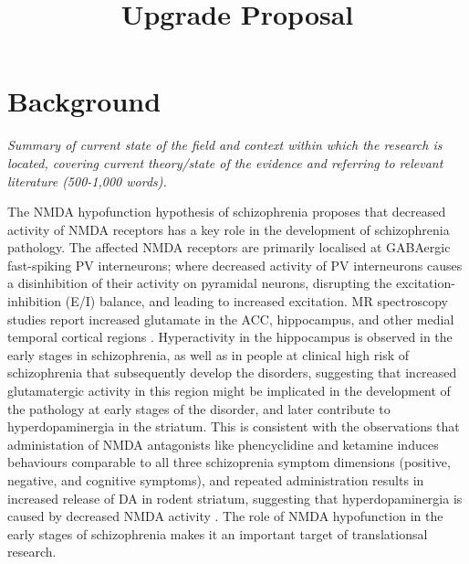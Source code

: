\documentclass[
  letterpaper,
  DIV=11,
  numbers=noendperiod]{scrartcl}
\title{Upgrade Proposal}
\author{Julia Marcinkowska \and  \and }
\date{}
\begin{document}
\maketitle

\section{Background}\label{background}

\emph{Summary of current state of the field and context within which the
research is located, covering current theory/state of the evidence and
referring to relevant literature (500-1,000 words).}

The NMDA hypofunction hypothesis of schizophrenia proposes that
decreased activity of NMDA receptors has a key role in the development
of schizophrenia pathology. The affected NMDA receptors are primarily
localised at GABAergic fast-spiking PV
interneurons\autocite{nakazawa_spatial_2017}; where decreased activity
of PV interneurons causes a disinhibition of their activity on pyramidal
neurons, disrupting the excitation-inhibition (E/I) balance, and leading
to increased excitation. MR spectroscopy studies report increased
glutamate in the ACC, hippocampus, and other medial temporal cortical
regions
\autocite{merritt_nature_2017,kraguljac_increased_2013,marsman_glutamate_2013}.
Hyperactivity in the hippocampus is observed in the early stages in
schizophrenia, as well as in people at clinical high risk of
schizophrenia that subsequently develop the disorders, suggesting that
increased glutamatergic activity in this region might be implicated in
the development of the pathology at early stages of the disorder, and
later contribute to hyperdopaminergia in the striatum. This is
consistent with the observations that administation of {NMDA}
antagonists like phencyclidine and ketamine induces behaviours
comparable to all three schizoprenia symptom dimensions (positive,
negative, and cognitive symptoms)\autocite{beck_association_2020}, and
repeated administration results in increased release of {DA} in rodent
striatum\autocite{balla_continuous_2001}, suggesting that
hyperdopaminergia is caused by decreased {NMDA} activity
\autocite{grace_dopamine_2012,grace_dysregulation_2016}. The role of
NMDA hypofunction in the early stages of schizophrenia makes it an
important target of translationsal research.
\end{document}
